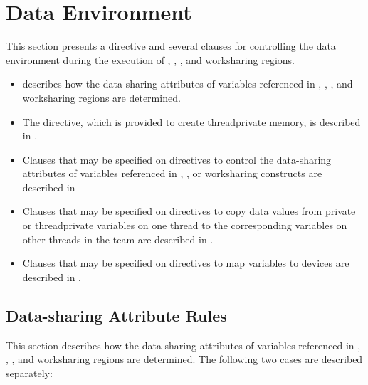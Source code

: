 \section{Data Environment}
\label{sec:Data Environment}
This section presents a directive and several clauses for controlling the data environment 
during the execution of , , , and worksharing regions.

\begin{itemize}
\item {} 
describes how the data-sharing attributes of variables 
referenced in , , , and worksharing regions are determined.

\item The  directive, which is provided to create threadprivate memory, 
is described in .

\item Clauses that may be specified on directives to control the data-sharing attributes of 
variables referenced in , ,  or worksharing constructs are 
described in 

\item Clauses that may be specified on directives to copy data values from private or 
threadprivate variables on one thread to the corresponding variables on other threads 
in the team are described in .

\item Clauses that may be specified on directives to map variables to devices are described in 
.
\end{itemize}










\subsection{Data-sharing Attribute Rules}
\label{subsec:Data-sharing Attribute Rules}
This section describes how the data-sharing attributes of variables referenced in 
, , , and worksharing regions are determined. The following two 
cases are described separately:

